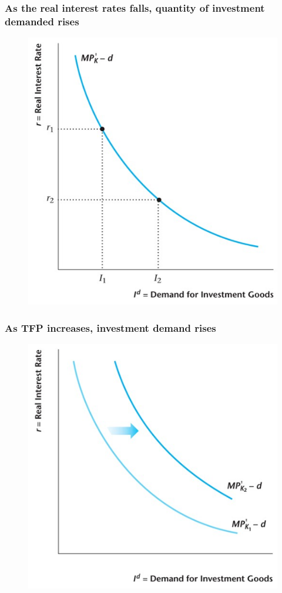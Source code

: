 \documentclass{beamer}
\begin{document}
\begin{frame}
\frametitle[alignment=center]{As the real interest rates falls, quantity of investment demanded rises}
\begin{figure}
\centering
\includegraphics[scale=0.6]{Figures/W_Fig_11pt9.png}
\end{figure}
\end{frame}

\begin{frame}
\frametitle[alignment=center]{As TFP increases, investment demand rises}
\begin{figure}
\centering
\includegraphics[scale=0.6]{Figures/W_Fig_11pt10.png}
\end{figure}
\end{frame}
\end{document}
